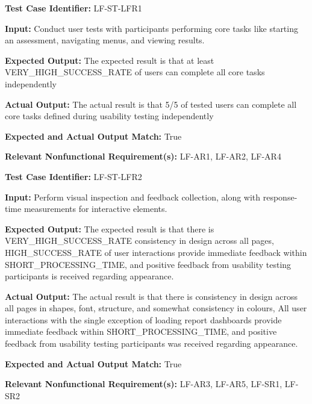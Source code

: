 \documentclass[12pt, titlepage]{article}
\begin{document}
\begin{mdframed}[linewidth=0.5mm] \par
  \textbf{Test Case Identifier:} LF-ST-LFR1 \par
  \textbf{Input:} Conduct user tests with participants performing core tasks like starting an assessment, navigating menus, and viewing results. \par
  \textbf{Expected Output:} The expected result is that at least \\VERY\_HIGH\_SUCCESS\_RATE of users can complete all core tasks independently \par
  \textbf{Actual Output:} The actual result is that 5/5 of tested users can complete all core tasks defined during usability testing independently \par
  \textbf{Expected and Actual Output Match:} True \par
  \textbf{Relevant Nonfunctional Requirement(s):} LF-AR1, LF-AR2, LF-AR4
\end{mdframed}

\begin{mdframed}[linewidth=0.5mm] \par
  \textbf{Test Case Identifier:} LF-ST-LFR2 \par
  \textbf{Input:} Perform visual inspection and feedback collection, along with response-time measurements for interactive elements. \par
  \textbf{Expected Output:} The expected result is that there is \\VERY\_HIGH\_SUCCESS\_RATE consistency in design across all pages, \\HIGH\_SUCCESS\_RATE of user interactions provide immediate feedback within SHORT\_PROCESSING\_TIME, and positive feedback from usability testing participants is received regarding appearance. \par
  \textbf{Actual Output:} The actual result is that there is consistency in design across all pages in shapes, font, structure, and somewhat consistency in colours, All user interactions with the single exception of loading report dashboards provide immediate feedback within SHORT\_PROCESSING\_TIME, and positive feedback from usability testing participants was received regarding appearance. \par
  \textbf{Expected and Actual Output Match:} True \par
  \textbf{Relevant Nonfunctional Requirement(s):} LF-AR3, LF-AR5, LF-SR1, LF-SR2
\end{mdframed}
		
\end{document}
